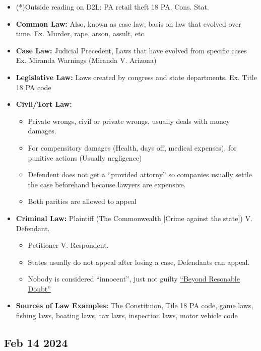 \documentclass[12pt]{article}
\begin{document}
\begin{itemize}
		  \item (*)Outside reading on D2L: PA retail theft 18 PA. Cons. Stat.
		  \item \textbf{Common Law:} Also, known as case law, basis on law that evolved over time. Ex.
					 Murder, rape, arson, assult, etc.
		  \item \textbf{Case Law:} Judicial Precedent, Laws that have evolved from specific cases
					 Ex. Miranda Warnings (Miranda V. Arizona)
		  \item \textbf{Legislative Law:} Laws created by congress and state departments. Ex. Title 18 PA code
		  \item \textbf{Civil/Tort Law:} 
						\begin{itemize}
								  \item Private wrongs, civil or private wrongs, usually deals with money damages.
								  \item For compensitory damages (Health, days off, medical expenses),
											 for punitive actions (Usually negligence)
								  \item Defendent does not get a ``provided attorny'' so companies usually 
											 settle the case beforehand because lawyers are expensive. 
								  \item Both parities are allowed to appeal
						\end{itemize}
		  \item \textbf{Criminal Law:} Plaintiff (The Commonwealth [Crime against the state]) V. Defendant.
						\begin{itemize}
								  \item Petitioner V. Respondent. 
								  \item States usually do not appeal after losing a case, Defendants can appeal. 
								  \item Nobody is considered ``innocent'',
											 just not guilty \underline{``Beyond Resonable Doubt''}
						\end{itemize}
		  \item \textbf{Sources of Law Examples:} The Constituion, Tile 18 PA code, game laws, fishing laws,
					 boating laws, tax laws, inspection laws, motor vehicle code
\end{itemize}

\subsection*{Feb 14 2024}
\end{document}
